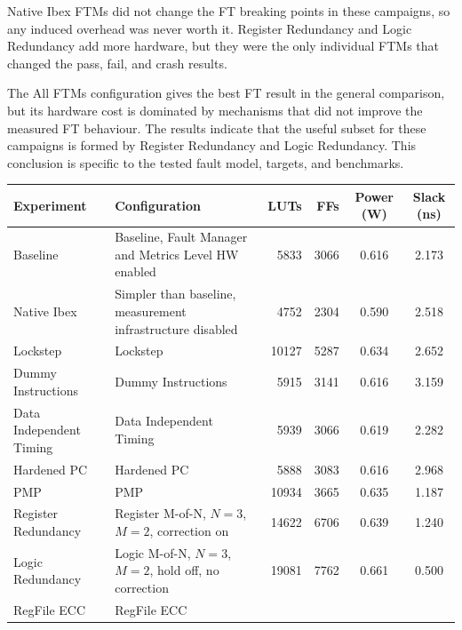 Native Ibex \acp{FTM} did not change the \ac{FT} breaking points in these campaigns, so any induced overhead was never worth it. Register Redundancy and Logic Redundancy add more hardware, but they were the only individual \acp{FTM} that changed the pass, fail, and crash results.

The All \acp{FTM} configuration gives the best \ac{FT} result in the general comparison, but its hardware cost is dominated by mechanisms that did not improve the measured \ac{FT} behaviour. The results indicate that the useful subset for these campaigns is formed by Register Redundancy and Logic Redundancy. This conclusion is specific to the tested fault model, targets, and benchmarks.

\begin{table}[h]
\centering
\scriptsize
\setlength{\tabcolsep}{3.2pt}
\renewcommand{\arraystretch}{1.15}
\begin{tabularx}{\textwidth}{|p{}|X|r|r|c|c|}
\hline
\rowcolor{tableheader}\textbf{Experiment} &
\textbf{Configuration} &
\textbf{\acp{LUT}} &
\textbf{\acp{FF}} &
\textbf{Power (W)} &
\textbf{Slack (ns)} \\
\hline
\hline
\rowcolor{green!25}
Baseline &
Baseline, Fault Manager and Metrics Level HW enabled &
5833 &
3066 &
0.616 &
2.173 \\
\hline
\rowcolor{yellow!10}
Native Ibex &
Simpler than baseline, measurement infrastructure disabled &
4752 &
2304 &
0.590 &
2.518 \\
\hline
\rowcolor{yellow!10}
Lockstep &
Lockstep &
10127 &
5287 &
0.634 &
2.652 \\
\hline
\rowcolor{yellow!10}
Dummy Instructions &
Dummy Instructions &
5915 &
3141 &
0.616 &
3.159 \\
\hline
\rowcolor{yellow!10}
Data Independent Timing &
Data Independent Timing &
5939 &
3066 &
0.619 &
2.282 \\
\hline
\rowcolor{yellow!10}
Hardened \ac{PC} &
Hardened \ac{PC} &
5888 &
3083 &
0.616 &
2.968 \\
\hline
\rowcolor{yellow!10}
PMP &
PMP &
10934 &
3665 &
0.635 &
1.187 \\
\hline
\rowcolor{yellow!10}
Register Redundancy &
Register M-of-N, $N=3$, $M=2$, correction on &
14622 &
6706 &
0.639 &
1.240 \\
\hline
\rowcolor{yellow!10}
Logic Redundancy &
Logic M-of-N, $N=3$, $M=2$, hold off, no correction &
19081 &
7762 &
0.661 &
0.500 \\
\hline
\rowcolor{yellow!10}
RegFile \ac{ECC} &
RegFile \ac{ECC} &

\end{tabularx}
\end{table}
